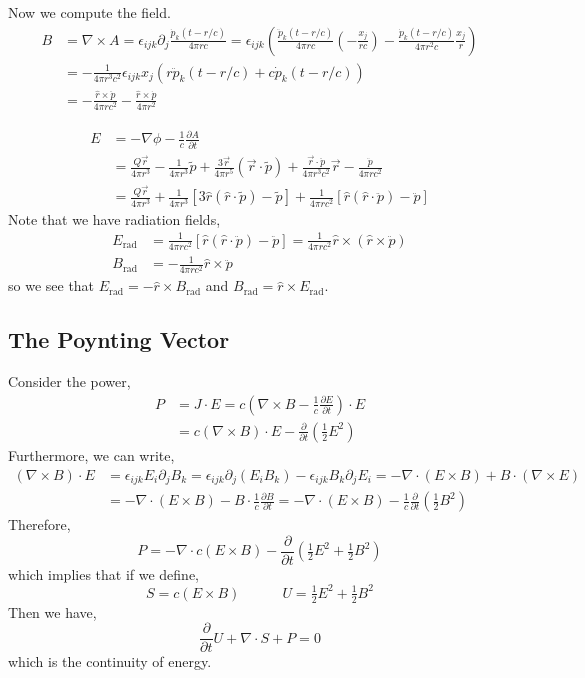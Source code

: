 \documentclass[12pt]{extarticle}
\newcommand{\pderiv}[2]{\frac{\partial{#1}}{\partial{#2}}}
\theoremstyle{definition}
\begin{document}
Now we compute the field.
\begin{align*}
B & = \nabla \times A = \epsilon_{ijk} \partial_j \frac{\dot{p}_k(t - r/c)}{4 \pi r c} = \epsilon_{ijk} \left(  \frac{\ddot{p}_k(t - r/c)}{4 \pi r c} \left( - \frac{x_j}{rc} \right) - \frac{\dot{p}_k(t - r/c)}{4 \pi r^2 c} \frac{x_j}{r} \right)
\\
& = - \frac{1}{4 \pi r^3 c^2} \epsilon_{ijk} x_j \left( r \ddot{p}_k(t - r/c) + c \dot{p}_k(t - r/c) \right)
\\
& = - \frac{\hat{r} \times  \ddot{p}}{4 \pi r c^2} - \frac{\hat{r} \times \dot{p}}{4 \pi r^2} 
\end{align*} 

\begin{align*}
E & = - \nabla \phi - \frac{1}{c} \pderiv{A}{t}
\\
& = \frac{Q \vec{r}}{4 \pi r^3} - \frac{1}{4 \pi r^3} \tilde{p} + \frac{3 \vec{r}}{4 \pi r^5} (\vec{r} \cdot \tilde{p}) + \frac{\vec{r} \cdot \ddot{p}}{4 \pi r^3 c^2} \vec{r} - \frac{\ddot{p}}{4 \pi r c^2}
\\
& = \frac{Q \vec{r}}{4 \pi r^3} + \frac{1}{4 \pi r^3} [3 \hat{r} (\hat{r} \cdot \tilde{p}) - \tilde{p}] + \frac{1}{4 \pi r c^2} [\hat{r} (\hat{r} \cdot \ddot{p}) - \ddot{p} ]
\end{align*}
Note that we have radiation fields,
\begin{align*}
E_{\text{rad}} & = \frac{1}{4 \pi r c^2} [\hat{r} (\hat{r} \cdot \ddot{p}) - \ddot{p} ] = \frac{1}{4 \pi r c^2} \hat{r} \times (\hat{r} \times \ddot{p}) 
\\
B_{\text{rad}} & = - \frac{1}{4 \pi r c^2} \hat{r} \times \ddot{p} 
\end{align*}
so we see that $E_{\text{rad}} = - \hat{r} \times B_{\text{rad}}$ and $B_{\text{rad}} = \hat{r} \times E_{\text{rad}}$. 
 
\subsection{The Poynting Vector}

Consider the power,
\begin{align*}
P & = J \cdot E = c \left( \nabla \times B - \frac{1}{c} \pderiv{E}{t} \right) \cdot E
\\
& = c (\nabla \times B) \cdot E - \pderiv{}{t} \left( \tfrac{1}{2} E^2 \right) 
\end{align*}
Furthermore, we can write,
\begin{align*}
(\nabla \times B) \cdot E & = \epsilon_{ijk} E_i \partial_j B_k = \epsilon_{ijk} \partial_j (E_i B_k) - \epsilon_{ijk} B_k \partial_j E_i = - \nabla \cdot (E \times B)  + B \cdot (\nabla \times E) 
\\ 
& = - \nabla \cdot (E \times B) - B \cdot \frac{1}{c} \pderiv{B}{t} = - \nabla \cdot (E \times B) - \frac{1}{c} \pderiv{}{t} (\tfrac{1}{2} B^2) 
\end{align*}
Therefore,
\[ P = - \nabla \cdot c(E \times B) - \pderiv{}{t} \left( \tfrac{1}{2} E^2 + \tfrac{1}{2} B^2 \right) \]
which implies that if we define,
\[ S = c (E \times B) \quad \quad \quad U = \tfrac{1}{2} E^2 + \tfrac{1}{2} B^2 \]
Then we have,
\[ \pderiv{}{t} U + \nabla \cdot S + P = 0 \]
which is the continuity of energy. 
 
\end{document}
